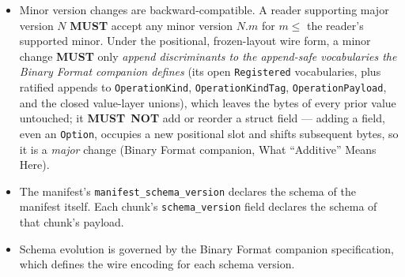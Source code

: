 \documentclass[11pt,letterpaper]{report}
\newcommand{\sectionsc}[1]{{\addfontfeatures{Letters=SmallCaps}#1}}
\newcounter{requirement}[chapter]
\newcommand{\MUST}{\textbf{MUST}}
\newcommand{\MUSTNOT}{\textbf{MUST}\nobreak\ \textbf{NOT}}
\begin{document}
\begin{requirement}
\begin{itemize}
      proceed silently: doing so would fork canonical state
      against any reader that does understand the operation.
    \item Minor version changes are backward-compatible. A reader
      supporting major version $N$ \MUST{} accept any minor version
      $N.\textit{m}$ for $m \leq$ the reader's supported minor.
      Under the positional, frozen-layout wire form, a minor change
      \MUST{} only \emph{append discriminants to the append-safe
      vocabularies the Binary Format companion defines} (its open
      \texttt{Registered} vocabularies, plus ratified appends to
      \texttt{OperationKind}, \texttt{OperationKindTag},
      \texttt{OperationPayload}, and the closed value-layer unions), which
      leaves the bytes of every prior value untouched; it \MUSTNOT{} add or
      reorder a struct field --- adding a field, even an \texttt{Option},
      occupies a new positional slot and shifts subsequent bytes, so it is a
      \emph{major} change (Binary Format companion,
      \sectionsc{What ``Additive'' Means Here}).
    \item The manifest's \texttt{manifest\_schema\_version} declares
      the schema of the manifest itself. Each chunk's
      \texttt{schema\_version} field declares the schema of that
      chunk's payload.
    \item Schema evolution is governed by the Binary Format
      companion specification, which defines the wire encoding
      for each schema version.
  \end{itemize}
\end{requirement}
\end{document}
